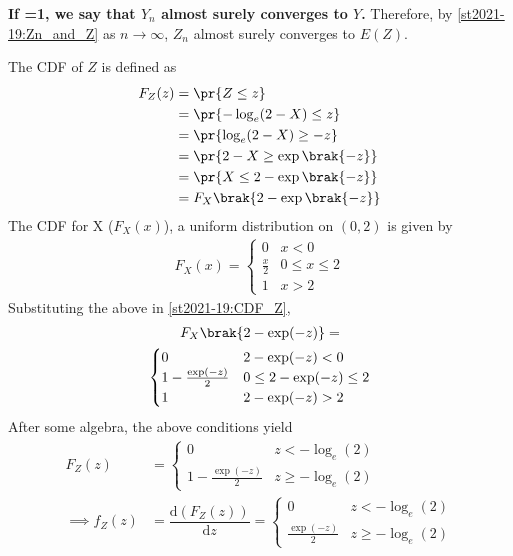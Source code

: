 \textbf{If =1, we say that $Y_n$ almost surely converges to $Y$.} Therefore, by \eqref{st2021-19:Zn_and_Z} as $n \to \infty$, $Z_n$ almost surely converges to $E(Z)$.\\
\par The CDF of $Z$ is defined as 
\begin{align}
    F_Z(z) &= \pr{Z \leq z} \\
           &= \pr{ -\log_e(2-X)\leq z} \\
           &= \pr{\log_e(2-X) \geq -z}\\
           &= \pr{2-X \geq \exp\brak{-z}}\\
           &= \pr{X \leq 2- \exp\brak{-z}}\\
           &= F_X\brak{2- \exp\brak{-z}}
\label{st2021-19:CDF_Z}
\end{align}
The CDF for X ($F_X(x)$), a uniform distribution on $(0,2)$ is given by
\begin{align}
F_X(x) = 
\begin{cases}
0 &  x < 0 \\
\frac{x}{2} & 0 \leq x \leq 2 \\
1 & x > 2
\end{cases}
\end{align}
%
Substituting the above in \eqref{st2021-19:CDF_Z},
%
\begin{multline}
F_X\brak{2- \exp(-z)} =
\\
\begin{cases}
0 &  2- \exp(-z) < 0 \\
1- \frac{\exp(-z)}{2} & 0 \leq 2- \exp(-z) \leq 2 \\
1 & 2- \exp(-z) > 2
\end{cases}
\end{multline}
After some algebra, the above conditions yield
\begin{align}
F_Z(z) &= 
\begin{cases}
0 & z < -\log_e (2) \\
1- \frac{\exp(-z)}{2} & z \geq -\log_e (2)
\end{cases}
\label{st2021-19:CDF_Z_Final}\\
\implies f_Z(z)&=\dfrac{\text{d}(F_Z(z))}{\text{d}z}   
=\begin{cases}
0 & z < -\log_e (2) \\
\frac{\exp(-z)}{2} & z \geq -\log_e (2)
\end{cases}
\label{st2021-19:PDF_Z_Final}
\end{align}
